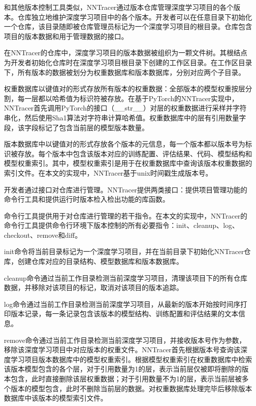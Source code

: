 \documentclass{cjc}
\begin{document}
和其他版本控制工具类似，NNTracer通过版本仓库管理深度学习项目的各个版本。仓库独立地维护深度学习项目中的各个版本。开发者可以在任意目录下初始化一个仓库，该目录随即被仓库管理员标记为一个深度学习项目的根目录。仓库包含项目的版本数据和用于管理数据的接口。

在NNTracer的仓库中，深度学习项目的版本数据被组织为一颗文件树。其根结点为开发者初始化仓库时在深度学习项目根目录下创建的工作区目录。在工作区目录下，所有版本的数据被划分为权重数据库和版本数据库，分别对应两个子目录。

权重数据库以键值对的形式存放所有版本的权重数据：全部版本的模型权重按层分割，每一层都以哈希值为标识符被存放。在基于PyTorch的NNTracer实现中，NNTracer首先调用PyTorch的接口（\_\_str\_\_）对层的权重数据进行采样并字符串化，然后使用Sha1算法对字符串计算哈希值。权重数据库中的层有引用数量字段，该字段标记了包含当前层的模型版本数量。

版本数据库中以键值对的形式存放各个版本的元信息，每一个版本都以版本号为标识被存放。每个版本中包含该版本对应的训练配置、评估结果、代码、模型结构和模型权重索引。其中，模型权重索引是用于在权重数据库中查询该版本权重数据的索引文件。在本文的实现中，NNTracer基于unix时间戳生成版本号。

开发者通过接口对仓库进行管理。NNTracer提供两类接口：提供项目管理功能的命令行工具和提供运行时版本检入检出功能的库函数。

命令行工具提供用于对仓库进行管理的若干指令。在本文的实现中，NNTracer的命令行工具提供命令行环境下版本控制的所有必要指令：init、cleanup、log、checkout、remove和diff。

init命令将当前目录标记为一个深度学习项目，并在当前目录下初始化NNTracer仓库，创建仓库对应的目录结构、模型数据库和版本数据库。

cleanup命令通过当前工作目录检测当前深度学习项目，清理该项目下的所有仓库数据，并移除对该项目的标记，取消对该项目的版本追踪。

log命令通过当前工作目录检测当前深度学习项目，从最新的版本开始按时间序打印版本记录，每一条记录包含该版本的模型结构、训练配置和评估结果的文本信息。

remove命令通过当前工作目录检测当前深度学习项目，并接收版本号作为参数，移除该深度学习项目中对应版本的权重文件。NNTracer首先根据版本号查询该深度学习项目版本数据库中的模型权重索引。根据模型权重索引在权重数据库中检索该版本模型包含的各个层，对于引用数量为1的层，表示当前层仅被即将删除的版本包含，此时直接删除该层权重数据；对于引用数量不为1的层，表示当前层被多个版本的模型包含，此时不删除当前层的数据。对权重数据库处理完毕后移除版本数据库中该版本的模型索引文件。
\end{document}
